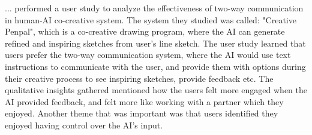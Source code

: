 \documentclass[final,5p,times,twocolumn,authoryear]{article}
\begin{document}

... performed a user study to analyze the effectiveness of two-way
communication in human-AI co-creative system. The system they studied
was called: "Creative Penpal", which is a co-creative drawing program,
where the AI can generate refined and inspiring sketches from user's
line sketch. The user study learned that users prefer the two-way
communication system, where the AI would use text instructions to
communicate with the user, and provide them with options during their
creative process to see inspiring sketches, provide feedback etc. The
qualitative insights gathered mentioned how the users felt more engaged
when the AI provided feedback, and felt more like working with a partner
which they enjoyed. Another theme that was important was that users
identified they enjoyed having control over the AI's input.

\end{document}
